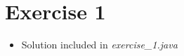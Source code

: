 \documentclass[12pt]{article}
\begin{document}
\bigskip

\section{Exercise 1}

\bigskip

\begin{itemize}
    \item Solution included in \textit{exercise\_1.java}
\end{itemize}

\bigskip
\end{document}
